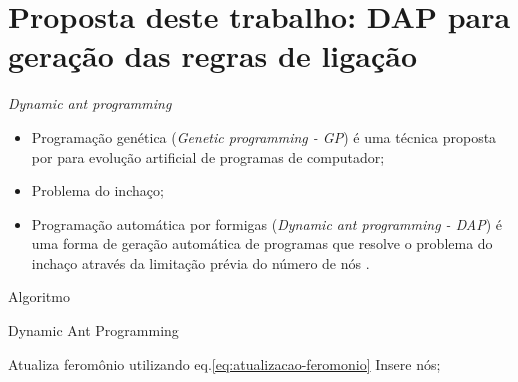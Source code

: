 \documentclass{beamer}
\begin{document}
  \section{Proposta deste trabalho: DAP para geração das regras de ligação}
  \begin{frame}{\textit{Dynamic ant programming}}
      \begin{itemize}
          \item Programação genética (\textit{Genetic programming - GP}) é uma técnica proposta por \cite{koza} para evolução artificial de programas de computador;
          \item Problema do inchaço;
          \item Programação automática por formigas (\textit{Dynamic ant programming - DAP}) é uma forma de geração automática de programas que resolve o problema do inchaço através da limitação prévia do número de nós \cite{shirakawa}.
      \end{itemize}
  \end{frame}

  \begin{frame}{Algoritmo}
        \begin{algorithm}[H]
        \caption{Dynamic Ant Programming}
        \label{alg:dap}
        \begin{algorithmic}[1]

        \Repeat
        \Repeat
        \EndFor
        \State Atualiza feromônio utilizando eq.\ref{eq:atualizacao-feromonio}
        \State Insere nós;
        \EndProcedure
        \end{algorithmic}
        \end{algorithm}
  \end{frame}
\end{document}

